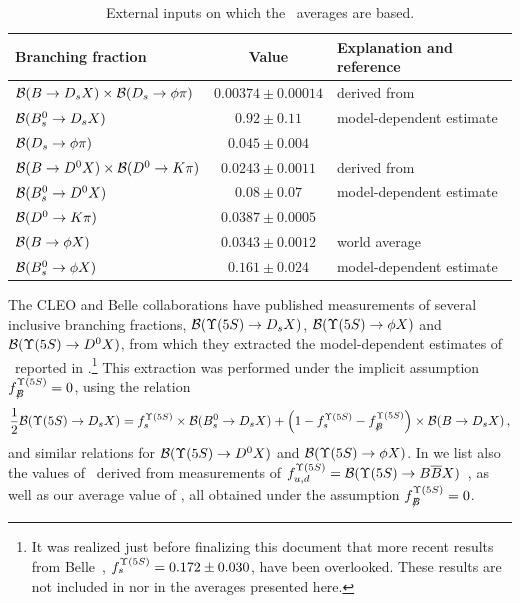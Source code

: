 \begin{table}
\caption{External inputs on which the \fsfive\ averages are based.}
\begin{center}
\begin{tabular}{lcl}
\hline
Branching fraction   & Value     & Explanation and reference \\
\hline
${\cal B}(B\to D_s X)\times {\cal B}(D_s \to \phi\pi)$ & 
$0.00374\pm 0.00014$ & derived from~\cite{PDG_2012} \\
${\cal B}(B^0_s \to D_s X)$ & 
$0.92\pm0.11$ & model-dependent estimate~\cite{Artuso:2005xw} \\
${\cal B}(D_s \to \phi\pi)$ & 
$0.045\pm0.004$ & \cite{PDG_2012} \\
${\cal B}(B\to D^0 X)\times {\cal B}(D^0 \to K\pi)$ & 
$0.0243\pm0.0011$ & derived from~\cite{PDG_2012} \\
${\cal B}(B^0_s \to D^0 X)$ & 
$0.08\pm0.07$ & model-dependent estimate~\cite{Drutskoy:2006fg,Artuso:2005xw} \\
${\cal B}(D^0 \to K\pi)$ & 
$0.0387\pm0.0005$ & \cite{PDG_2012} \\
${\cal B}(B \to \phi X)$ & 
$0.0343\pm0.0012$ & world average~\cite{PDG_2012,Huang:2006em_mod} \\
${\cal B}(B^0_s \to \phi X)$ &
$0.161\pm0.024$ & model-dependent estimate~\cite{Huang:2006em_mod} \\
\hline
\end{tabular}
\end{center}
\end{table}

The CLEO and Belle collaborations have published %
measurements of several inclusive \Upsfive branching fractions, 
${\cal B}(\Upsilon(5S)\to D_s X)$, 
${\cal B}(\Upsilon(5S)\to \phi X)$ and 
${\cal B}(\Upsilon(5S)\to D^0 X)$, %
from which they extracted the
model-dependent estimates of \fsfive\
reported in .\footnote{%
  \label{foot:life_mix:Esen:2012yz_mod}
  It was realized just before finalizing this document that
  more recent results from Belle~\cite{Esen:2012yz}, 
  $f^{\Upsilon(5S)}_{s} = 0.172 \pm 0.030$, have been overlooked. These results are 
  not included in \Table{fsFiveS} nor in the averages presented here. 
} %
This extraction was performed 
under the implicit assumption  
$f^{\Upsilon(5S)}_{B\!\!\!\!/}=0$, using the relation 
\begin{equation}
\frac12{\cal B}(\Upsfive\to D_s X)=\fsfive\times{\cal B}(B_s^0\to D_s X) + 
\left(1-\fsfive-\fnBfive\right)\times{\cal B}(B\to D_s X) \,,
\labe{Ds_correct}
\end{equation}
and similar relations for
${\cal B}(\Upsilon(5S)\to D^0 X)$ and ${\cal B}(\Upsilon(5S)\to \phi X)$.
In  we list also
the values of \fsfive\ derived from measurements of
$\fudfive={\cal B}(\Upsfive\to B\bar BX)$~\cite{Huang:2006em_mod,Drutskoy:2010an}, as well as our average value of  \fsfive,
all obtained under the assumption $f^{\Upsilon(5S)}_{B\!\!\!\!/}=0$.

